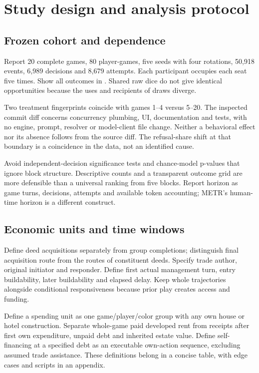 \section{Study design and analysis protocol}
\subsection{Frozen cohort and dependence}
Report 20 complete games, 80 player-games, five seeds with four rotations, 50,918 events, 6,989 decisions and 8,679 attempts. Each participant occupies each seat five times. Show all outcomes in . Shared raw dice do not give identical opportunities because the uses and recipients of draws diverge.

Two treatment fingerprints coincide with games 1--4 versus 5--20. The inspected commit diff concerns concurrency plumbing, UI, documentation and tests, with no engine, prompt, resolver or model-client file change. Neither a behavioral effect nor its absence follows from the source diff. The refusal-share shift at that boundary is a coincidence in the data, not an identified cause.

Avoid independent-decision significance tests and chance-model p-values that ignore block structure. Descriptive counts and a transparent outcome grid are more defensible than a universal ranking from five blocks. Report horizon as game turns, decisions, attempts and available token accounting; METR's human-time horizon is a different construct.

\subsection{Economic units and time windows}
Define deed acquisitions separately from group completions; distinguish final acquisition route from the routes of constituent deeds. Specify trade author, original initiator and responder. Define first actual management turn, entry buildability, later buildability and elapsed delay. Keep whole trajectories alongside conditional responsiveness because prior play creates access and funding.

Define a spending unit as one game/player/color group with any own house or hotel construction. Separate whole-game paid developed rent from receipts after first own expenditure, unpaid debt and inherited estate value. Define self-financing at a specified debt as an executable own-action sequence, excluding assumed trade assistance. These definitions belong in a concise table, with edge cases and scripts in an appendix.

